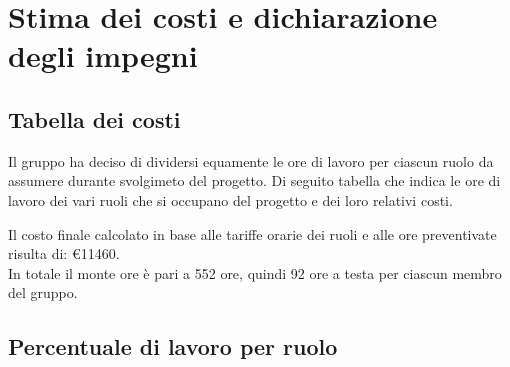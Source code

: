 \section{Stima dei costi e dichiarazione degli impegni}

\setcounter{subsection}{0}
\subsection{Tabella dei costi}
Il gruppo ha deciso di dividersi equamente le ore di lavoro per ciascun ruolo da assumere durante svolgimeto del progetto. Di seguito tabella che indica le ore di
lavoro dei vari ruoli che si occupano del progetto e dei loro relativi costi.



\noindent Il costo finale calcolato in base alle tariffe orarie dei ruoli e alle ore preventivate risulta di: \euro{11460}.\\
In totale il monte ore è pari a 552 ore, quindi 92 ore a testa per ciascun membro del gruppo.\\

\subsection{Percentuale di lavoro per ruolo}



\newpage

